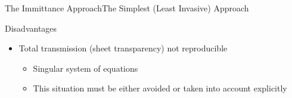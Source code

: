 \begin{frame}[allowframebreaks]{The Immittance Approach}{The Simplest (Least Invasive)
    Approach}
\begin{itemize}
    \begin{block}{Disadvantages}
      \begin{itemize}
      \item Total transmission (sheet transparency) \alert{not reproducible}
        \begin{itemize}
        \item \alert{Singular} system of equations
        \item This situation must be either avoided or taken into
          account explicitly
        \end{itemize}
      \end{itemize}
    \end{block}

  \end{itemize}

\end{frame}
  


